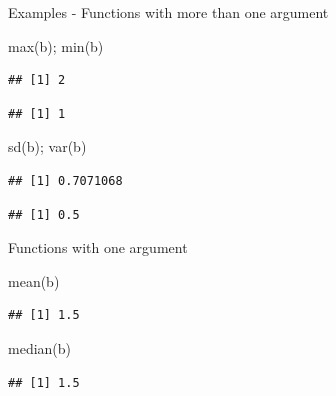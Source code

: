 \documentclass[
  10pt,
  ignorenonframetext,
]{beamer}
\newenvironment{Shaded}{\begin{snugshade}}{\end{snugshade}}
\newcommand{\KeywordTok}[1]{\textcolor[rgb]{0.94,0.87,0.69}{#1}}
\newcommand{\NormalTok}[1]{\textcolor[rgb]{0.80,0.80,0.80}{#1}}
\begin{document}
\begin{frame}[fragile]{Examples - Functions with more than one argument}
\protect\hypertarget{examples---functions-with-more-than-one-argument}{}

\begin{Shaded}
\begin{Highlighting}[]
\KeywordTok{max}\NormalTok{(b); }\KeywordTok{min}\NormalTok{(b)}
\end{Highlighting}
\end{Shaded}

\begin{verbatim}
## [1] 2
\end{verbatim}

\begin{verbatim}
## [1] 1
\end{verbatim}

\begin{Shaded}
\begin{Highlighting}[]
\KeywordTok{sd}\NormalTok{(b); }\KeywordTok{var}\NormalTok{(b)}
\end{Highlighting}
\end{Shaded}

\begin{verbatim}
## [1] 0.7071068
\end{verbatim}

\begin{verbatim}
## [1] 0.5
\end{verbatim}

\begin{block}{Functions with one argument}

\begin{Shaded}
\begin{Highlighting}[]
\KeywordTok{mean}\NormalTok{(b)}
\end{Highlighting}
\end{Shaded}

\begin{verbatim}
## [1] 1.5
\end{verbatim}

\begin{Shaded}
\begin{Highlighting}[]
\KeywordTok{median}\NormalTok{(b)}
\end{Highlighting}
\end{Shaded}

\begin{verbatim}
## [1] 1.5
\end{verbatim}

\end{block}

\end{frame}
\end{document}
